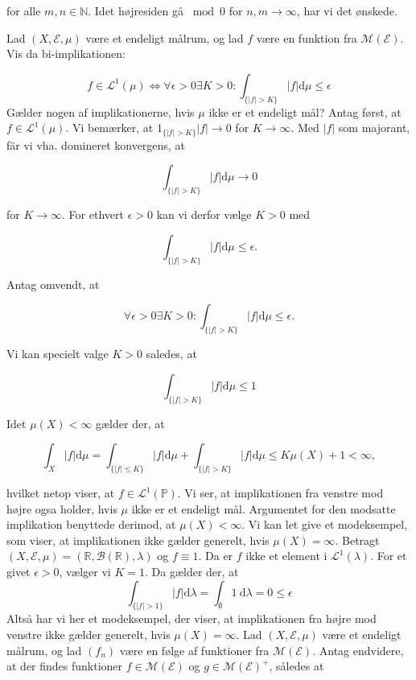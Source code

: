 \documentclass{Class}
\begin{document}
for alle $m, n \in \mathbb{N}$. Idet højresiden gå $\bmod 0$ for $n, m \rightarrow \infty$, har vi det ønskede.

Lad $(X, \mathcal{E}, \mu)$ være et endeligt målrum, og lad $f$ være en funktion fra $\mathcal{M}(\mathcal{E})$. Vis da bi-implikationen:

$$
f \in \mathcal{L}^1(\mu) \Longleftrightarrow \forall \epsilon>0 \exists K>0: \int_{\{|f|>K\}}|f| \mathrm{d} \mu \leq \epsilon
$$
Gælder nogen af implikationerne, hvis $\mu$ ikke er et endeligt mål?
\solution
Antag først, at $f \in \mathcal{L}^1(\mu)$. Vi bemærker, at $1_{\{|f|>K\}}|f| \rightarrow 0$ for $K \rightarrow \infty$. Med $|f|$ som majorant, fär vi vha. domineret konvergens, at

$$
\int_{\{|f|>K\}}|f| \mathrm{d} \mu \rightarrow 0
$$

for $K \rightarrow \infty$. For ethvert $\epsilon>0$ kan vi derfor vælge $K>0$ med

$$
\int_{\{|f|>K\}}|f| \mathrm{d} \mu \leq \epsilon .
$$


Antag omvendt, at

$$
\forall \epsilon>0 \exists K>0: \int_{\{|f|>K\}}|f| \mathrm{d} \mu \leq \epsilon .
$$


Vi kan specielt valge $K>0$ saledes, at

$$
\int_{\{|f|>K\}}|f| \mathrm{d} \mu \leq 1
$$


Idet $\mu(X)<\infty$ gælder der, at

$$
\int_X|f| \mathrm{d} \mu=\int_{\{|f| \leq K\}}|f| \mathrm{d} \mu+\int_{\{|f|>K\}}|f| \mathrm{d} \mu \leq K \mu(X)+1<\infty,
$$

hvilket netop viser, at $f \in \mathcal{L}^1(\mathbb{P})$.
Vi ser, at implikationen fra venstre mod højre ogsa holder, hvis $\mu$ ikke er et endeligt mål. Argumentet for den modsatte implikation benyttede derimod, at $\mu(X)<\infty$. Vi kan let give et modeksempel, som viser, at implikationen ikke gælder generelt, hvis $\mu(X)=\infty$. Betragt $(X, \mathcal{E}, \mu)=(\mathbb{R}, \mathcal{B}(\mathbb{R}), \lambda)$ og $f \equiv 1$. Da er $f$ ikke et element i $\mathcal{L}^1(\lambda)$. For et givet $\epsilon>0$, vælger vi $K=1$. Da gælder der, at
$$
\int_{\{|f|>1\}}|f| \mathrm{d} \lambda=\int_{\emptyset} 1 \mathrm{~d} \lambda=0 \leq \epsilon
$$
Altså har vi her et modeksempel, der viser, at implikationen fra højre mod venstre ikke gælder generelt, hvis $\mu(X)=\infty$.
Lad $(X, \mathcal{E}, \mu)$ være et endeligt målrum, og lad $\left(f_n\right)$ være en følge af funktioner fra $\mathcal{M}(\mathcal{E})$. Antag endvidere, at der findes funktioner $f \in \mathcal{M}(\mathcal{E})$ og $g \in \mathcal{M}(\mathcal{E})^{+}$, således at
\end{document}
